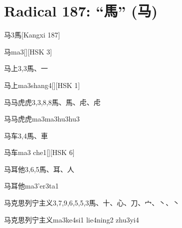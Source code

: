 
\section*{Radical 187: ``⾺'' (马)}

\begin{entry}{马}{3}{⾺}[Kangxi 187]
  \begin{phonetics}{马}{ma3}[][HSK 3]
  \end{phonetics}
\end{entry}

\begin{entry}{马上}{3,3}{⾺、⼀}
  \begin{phonetics}{马上}{ma3shang4}[][HSK 1]
  \end{phonetics}
\end{entry}

\begin{entry}{马马虎虎}{3,3,8,8}{⾺、⾺、⾌、⾌}
  \begin{phonetics}{马马虎虎}{ma3ma3hu3hu3}
  \end{phonetics}
\end{entry}

\begin{entry}{马车}{3,4}{⾺、⾞}
  \begin{phonetics}{马车}{ma3 che1}[][HSK 6]
  \end{phonetics}
\end{entry}

\begin{entry}{马耳他}{3,6,5}{⾺、⽿、⼈}
  \begin{phonetics}{马耳他}{ma3'er3ta1}
  \end{phonetics}
\end{entry}

\begin{entry}{马克思列宁主义}{3,7,9,6,5,5,3}{⾺、⼗、⼼、⼑、⼧、⼂、⼂}
  \begin{phonetics}{马克思列宁主义}{ma3ke4si1 lie4ning2 zhu3yi4}
  \end{phonetics}
\end{entry}

